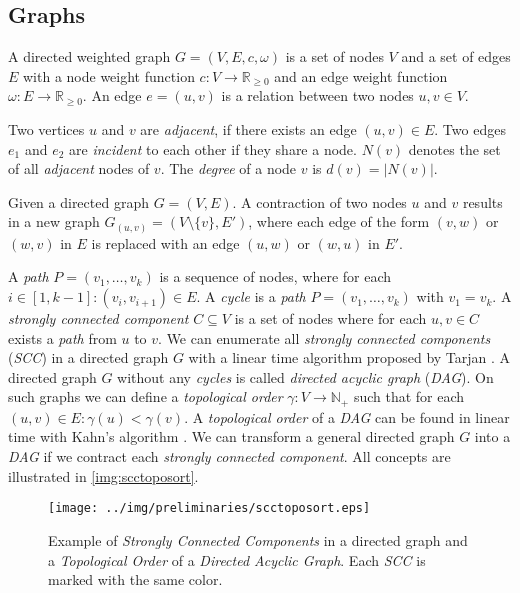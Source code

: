 \subsection{Graphs}

\begin{definition}
A directed weighted graph $G = (V,E,c,\omega)$ is a set of nodes $V$ 
and a set of edges $E$ with a node weight function 
$c: V \rightarrow \mathbb{R}_{\ge 0}$ and an edge weight 
function $\omega: E \rightarrow \mathbb{R}_{\ge 0}$. An edge $e = (u,v)$ 
is a relation between two nodes $u,v \in V$.
\label{def:hypergraph}
\end{definition}

Two vertices $u$ and $v$ are \emph{adjacent}, if there exists an edge
$(u,v) \in E$. Two edges $e_1$ and $e_2$ are \emph{incident} to each other if they
share a node. $N(v)$ denotes the set of all \emph{adjacent} nodes of 
$v$. The \emph{degree} of a node $v$ is $d(v) = |N(v)|$.

\begin{definition}
Given a directed graph $G = (V,E)$. A contraction of two nodes
$u$ and $v$ results in a new graph $G_{(u,v)} = (V\setminus\{v\},E')$, where
each edge of the form $(v,w)$ or $(w,v)$ in $E$ is replaced with an edge 
$(u,w)$ or $(w,u)$ in $E'$.
\label{def:contraction}
\end{definition}

A \emph{path} $P = (v_1,\ldots,v_k)$ is a sequence of nodes, where for
each $i \in [1,k-1]: (v_i,v_{i+1}) \in E$. A \emph{cycle} is a \emph{path}
$P = (v_1,\ldots,v_k)$ with $v_1 = v_k$. A \emph{strongly connected 
component} $C \subseteq V$ is a set of nodes where for each $u,v \in C$
exists a \emph{path} from $u$ to $v$. We can enumerate all \emph{strongly
connected components} (\emph{SCC}) in a directed graph $G$ with a linear time algorithm
proposed by Tarjan \cite{tarjan1972depth}. A directed graph $G$ without
any \emph{cycles} is called \emph{directed acyclic graph} (\emph{DAG}). On such
graphs we can define a \emph{topological order} $\gamma: V \rightarrow \mathbb{N}_+$ such
that for each $(u,v) \in E: \gamma(u) < \gamma(v)$. A \emph{topological order}
of a \emph{DAG} can be found in linear time with Kahn's algorithm \cite{kahn1962topological}.
We can transform a general directed graph $G$ into a \emph{DAG} if we contract
each \emph{strongly connected component}. All concepts are illustrated in 
\autoref{img:scctoposort}.

\begin{figure}[ht!]
\centering
\texttt{[image: ../img/preliminaries/scctoposort.eps]}
\caption{Example of \emph{Strongly Connected Components} in a directed graph and
         a \emph{Topological Order} of a \emph{Directed Acyclic Graph}. Each 
         \emph{SCC} is marked with the same color.} 
\label{img:scctoposort}
\end{figure}

